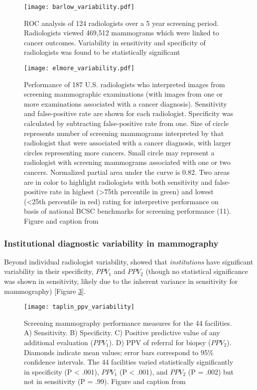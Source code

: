 \begin{figure}[h!]
	\centering
	\texttt{[image: barlow\_variability.pdf]}
	\caption[ROC analysis of 124 radiologists over a 5 year screening period]{ROC analysis of 124 radiologists over a 5 year screening period. Radiologists viewed 469,512 mammograms which were linked to cancer outcomes. Variability in sensitivity and specificity of radiologists was found to be statistically significant}
	\label{fig:barlow_variability}
\end{figure}

\begin{figure}[h!]
	\centering
	\texttt{[image: elmore\_variability.pdf]}
	\caption[Performance of 187 U.S. radiologists who interpreted images from screening mammographic examinations]{Performance of 187 U.S. radiologists who interpreted images from screening mammographic examinations (with images from one or more examinations associated with a cancer diagnosis). Sensitivity and false-positive rate are shown for each radiologist. Specificity was calculated by subtracting false-positive rate from one. Size of circle represents number of screening mammograms interpreted by that radiologist that were associated with a cancer diagnosis, with larger circles representing more cancers. Small circle may represent a radiologist with screening mammograms associated with one or two cancers. Normalized partial area under the curve is 0.82. Two areas are in color to highlight radiologists with both sensitivity and false-positive rate in highest (>75th percentile in green) and lowest (<25th percentile in red) rating for interpretive performance on basis of national BCSC benchmarks for screening performance (11). Figure and caption from \cite{Elmore:2009vu}}
	\label{fig:elmore_variability}
\end{figure}



\subsubsection{Institutional diagnostic variability in mammography}
Beyond individual radiologist variability,  showed that \emph{institutions} have significant variability in their specificity, $PPV_1$ and $PPV_2$ (though no statistical significance was shown in sensitivity, likely due to the inherent variance in sensitivity for mammography) [Figure \ref{fig:taplin_variability}].

\begin{figure}[h!]
	\centering
	\texttt{[image: taplin\_ppv\_variability]}
	\caption[Institutional variability in mammography]{Screening mammography performance measures for the 44 facilities. A) Sensitivity. B) Specificity. C) Positive predictive value of any additional evaluation ($PPV_1$). D) PPV of referral for biopsy ($PPV_2$). Diamonds indicate mean values; error bars correspond to 95\% confidence intervals. The 44 facilities varied statistically significantly in specificity (P < .001), $PPV_1$ (P < .001), and $PPV_2$ (P = .002) but not in sensitivity (P = .99). Figure and caption from \cite{Taplin:2008bv}}
	\label{fig:taplin_variability}
\end{figure}


